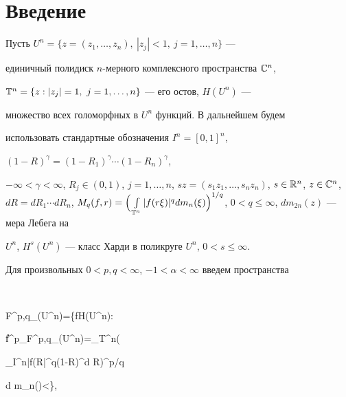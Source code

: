 \pagestyle{plain} %


 




\maketitle 


\label{begin} 


 


\section*{Введение} 


 


Пусть $U^n=\{z=(z_1,\dotsc,z_n),\ |z_j|<1,\ j=1,\dotsc,n\}$ --- 


единичный полидиск $n$-мерного комплексного пространства $\Bbb C^n$, 


$\Bbb T^n=\{z:|z_j|=1,\ j=1,\dotsc,n\}$ --- его остов, $H(U^n)$ --- 


множество всех голоморфных в $U^n$ функций. В дальнейшем будем 


использовать стандартные обозначения $I^n=[0,1]^n$, 


$(1-R)^\gamma=(1-R_1)^\gamma\dotsb(1-R_n)^\gamma$, 


$-\infty<\gamma<\infty$, $R_j\in(0,1)$, $j=1,\dotsc,n$, $s 


z=(s_1z_1,\dotsc,s_n z_n)$, $s\in\Bbb R^n$, $z\in\Bbb C^n$, $d R=d 


R_1\dotsb d R_n$, $M_q(f,r)=\Big(\int\limits_{\Bbb T^n}|f(r\xi)|^q d 


m_n(\xi)\Big)^{1/q}$, $0<q\le\infty$, $d m_{2n}(z)$ --- мера Лебега на 


$U^n$, $H^s(U^n)$ --- класс Харди в поликруге $U^n$, $0<s\le\infty$. 


Для произвольных $0<p,q<\infty$, $-1<\alpha<\infty$ введем пространства 


$$ 


F^{p,q}_\alpha(U^n)=\bigg\{f\in H(U^n): 


\|f\|^p_{F^{p,q}_\alpha(U^n)}=\int_{\Bbb T^n}\bigg( 


\int_{I^n}|f(R\xi|^q(1-R)^\alpha d R\bigg)^{p/q} 


d m_n(\xi)<\infty\bigg\}, 


